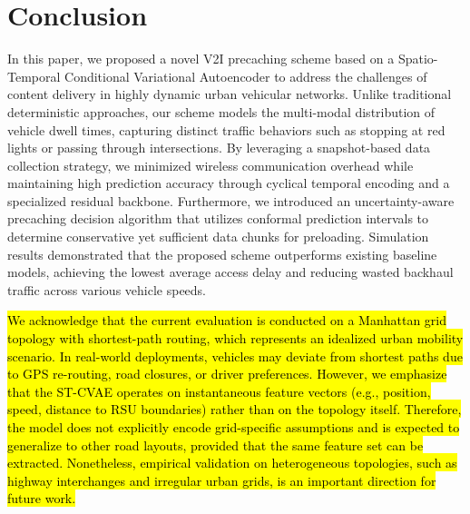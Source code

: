 \documentclass[journal]{IEEEtran}
\begin{document}
\section{Conclusion} \label{sec.c}
In this paper, we proposed a novel V2I precaching scheme based on a Spatio-Temporal Conditional Variational Autoencoder to address the challenges of content delivery in highly dynamic urban vehicular networks.
Unlike traditional deterministic approaches, our scheme models the multi-modal distribution of vehicle dwell times, capturing distinct traffic behaviors such as stopping at red lights or passing through intersections.
By leveraging a snapshot-based data collection strategy, we minimized wireless communication overhead while maintaining high prediction accuracy through cyclical temporal encoding and a specialized residual backbone.
Furthermore, we introduced an uncertainty-aware precaching decision algorithm that utilizes conformal prediction intervals to determine conservative yet sufficient data chunks for preloading.
Simulation results demonstrated that the proposed scheme outperforms existing baseline models, achieving the lowest average access delay and reducing wasted backhaul traffic across various vehicle speeds.

\hl{We acknowledge that the current evaluation is conducted on a Manhattan grid topology with shortest-path routing, which represents an idealized urban mobility scenario.
In real-world deployments, vehicles may deviate from shortest paths due to GPS re-routing, road closures, or driver preferences.
However, we emphasize that the ST-CVAE operates on instantaneous feature vectors (e.g., position, speed, distance to RSU boundaries) rather than on the topology itself.
Therefore, the model does not explicitly encode grid-specific assumptions and is expected to generalize to other road layouts, provided that the same feature set can be extracted.
Nonetheless, empirical validation on heterogeneous topologies, such as highway interchanges and irregular urban grids, is an important direction for future work.}
\end{document}
